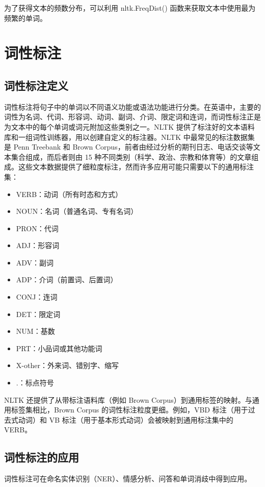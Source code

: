 为了获得文本的频数分布，可以利用 nltk.FreqDist() 函数来获取文本中使用最为频繁的单词。
\section{词性标注}
\subsection{词性标注定义}
词性标注将句子中的单词以不同语义功能或语法功能进行分类。在英语中，主要的词性为名词、代词、形容词、动词、副词、介词、限定词和连词，而词性标注正是为文本中的每个单词或词元附加这些类别之一。NLTK 提供了标注好的文本语料库和一组词性训练器，用以创建自定义的标注器。NLTK 中最常见的标注数据集是 Penn Treebank 和 Brown Corpus，前者由经过分析的期刊日志、电话交谈等文本集合组成，而后者则由 15 种不同类别（科学、政治、宗教和体育等）的文章组成。这些文本数据提供了细粒度标注，然而许多应用可能只需要以下的通用标注集：
\begin{itemize}
    \item VERB：动词（所有时态和方式）
    \item NOUN：名词（普通名词、专有名词）
    \item PRON：代词
    \item ADJ：形容词
    \item ADV：副词
    \item ADP：介词（前置词、后置词）
    \item CONJ：连词
    \item DET：限定词
    \item NUM：基数
    \item PRT：小品词或其他功能词
    \item X-other：外来词、错别字、缩写
    \item .：标点符号
\end{itemize}
NLTK 还提供了从带标注语料库（例如 Brown Corpus）到通用标签的映射。与通用标签集相比，Brown Corpus 的词性标注粒度更细。例如，VBD 标注（用于过去式动词）和 VB 标注（用于基本形式动词）会被映射到通用标注集中的 VERB。
\subsection{词性标注的应用}
词性标注可在命名实体识别（NER）、情感分析、问答和单词消歧中得到应用。